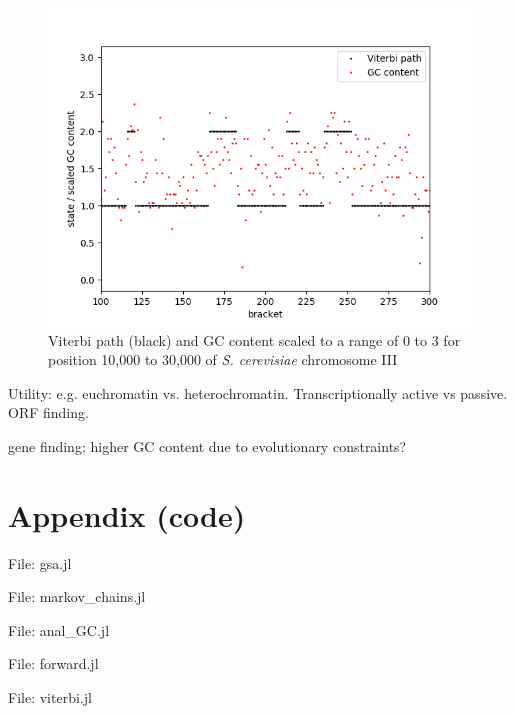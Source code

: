 \documentclass{article}
\begin{document}
\begin{figure}[h]
\centering
\includegraphics[width = 0.5\linewidth, trim={0 0 0 0}, clip=true]{viterbi_path.png}
\caption{Viterbi path (black) and GC content scaled to a range of 0 to 3 for position 10,000 to 30,000 of \textit{S. cerevisiae} chromosome III}
\label{fig:viterbi}
\end{figure}


Utility: e.g. euchromatin vs. heterochromatin. Transcriptionally active vs passive. ORF finding.

gene finding; higher GC content due to evolutionary constraints?



\section*{Appendix (code)}

\lstset{basicstyle=\footnotesize}

\large{File: gsa.jl}


\large{File: markov\_chains.jl}


\large{File: anal\_GC.jl}


\large{File: forward.jl}


\large{File: viterbi.jl}

\end{document}
